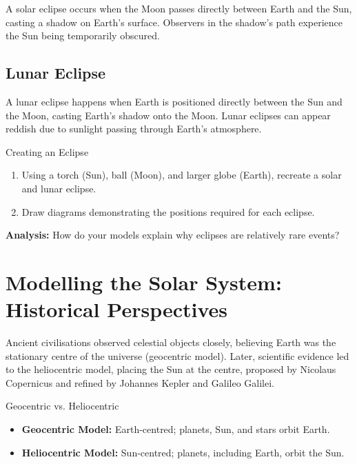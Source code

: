 A solar eclipse occurs when the Moon passes directly between Earth and the Sun, casting a shadow on Earth's surface. Observers in the shadow's path experience the Sun being temporarily obscured.


\subsection{Lunar Eclipse}

A lunar eclipse happens when Earth is positioned directly between the Sun and the Moon, casting Earth's shadow onto the Moon. Lunar eclipses can appear reddish due to sunlight passing through Earth's atmosphere.


\begin{investigation}{Creating an Eclipse}
\begin{enumerate}
    \item Using a torch (Sun), ball (Moon), and larger globe (Earth), recreate a solar and lunar eclipse.
    \item Draw diagrams demonstrating the positions required for each eclipse.
\end{enumerate}
\textbf{Analysis:} How do your models explain why eclipses are relatively rare events?
\end{investigation}

\section{Modelling the Solar System: Historical Perspectives}

Ancient civilisations observed celestial objects closely, believing Earth was the stationary centre of the universe (geocentric model). Later, scientific evidence led to the heliocentric model, placing the Sun at the centre, proposed by Nicolaus Copernicus and refined by Johannes Kepler and Galileo Galilei.

\begin{keyconcept}{Geocentric vs. Heliocentric}
\begin{itemize}
    \item \textbf{Geocentric Model:} Earth-centred; planets, Sun, and stars orbit Earth.
    \item \textbf{Heliocentric Model:} Sun-centred; planets, including Earth, orbit the Sun.
\end{itemize}
\end{keyconcept}

